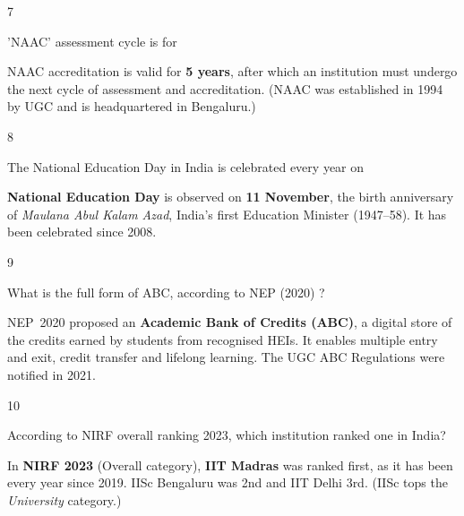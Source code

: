 \begin{question}{7}
{'NAAC' assessment cycle is for\par}
\begin{explain}
NAAC accreditation is valid for \textbf{5 years}, after which an institution must undergo the next cycle of assessment and accreditation. (NAAC was established in 1994 by UGC and is headquartered in Bengaluru.)
\end{explain}
\end{question}

\begin{question}{8}
{The National Education Day in India is celebrated every year on\par}
\begin{explain}
\textbf{National Education Day} is observed on \textbf{11 November}, the birth anniversary of \emph{Maulana Abul Kalam Azad}, India's first Education Minister (1947--58). It has been celebrated since 2008.
\end{explain}
\end{question}

\begin{question}{9}
{What is the full form of ABC, according to NEP (2020) ?\par}
\begin{explain}
NEP~2020 proposed an \textbf{Academic Bank of Credits (ABC)}, a digital store of the credits earned by students from recognised HEIs. It enables multiple entry and exit, credit transfer and lifelong learning. The UGC ABC Regulations were notified in 2021.
\end{explain}
\end{question}

\begin{question}{10}
{According to NIRF overall ranking 2023, which institution ranked one in India?\par}
\begin{explain}
In \textbf{NIRF 2023} (Overall category), \textbf{IIT Madras} was ranked first, as it has been every year since 2019. IISc Bengaluru was 2nd and IIT Delhi 3rd. (IISc tops the \emph{University} category.)
\end{explain}
\end{question}

